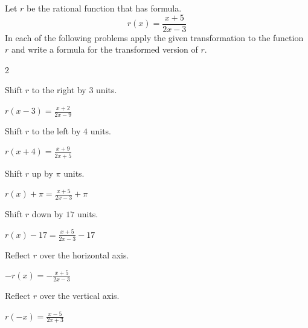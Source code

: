 \begin{exercises}
	 \begin{problem}
	 Let $r$ be the rational function that has formula.
	 \[
		 r(x)=\frac{x+5}{2x-3}
	 \]
	 In each of the following problems apply the given transformation to the function $r$ and
	 write a formula for the transformed version of $r$.
	 \begin{multicols}{2}
		 \begin{subproblem}
			 Shift $r$ to the right by $3$ units.
			 \begin{shortsolution}
				 $r(x-3)=\frac{x+2}{2x-9}$
			 \end{shortsolution}
		 \end{subproblem}
		 \begin{subproblem}
			 Shift $r$ to the left by $4$ units.
			 \begin{shortsolution}
				 $r(x+4)=\frac{x+9}{2x+5}$
			 \end{shortsolution}
		 \end{subproblem}
		 \begin{subproblem}
			 Shift $r$ up by $\pi$ units.
			 \begin{shortsolution}
				 $r(x)+\pi=\frac{x+5}{2x-3}+\pi$
			 \end{shortsolution}
		 \end{subproblem}
		 \begin{subproblem}
			 Shift $r$ down by $17$ units.
			 \begin{shortsolution}
				 $r(x)-17=\frac{x+5}{2x-3}-17$
			 \end{shortsolution}
		 \end{subproblem}
		 \begin{subproblem}
			 Reflect $r$ over the horizontal axis.
			 \begin{shortsolution}
				 $-r(x)=-\frac{x+5}{2x-3}$
			 \end{shortsolution}
		 \end{subproblem}
		 \begin{subproblem}
			 Reflect $r$ over the vertical axis.
			 \begin{shortsolution}
				 $r(-x)=\frac{x-5}{2x+3}$
			 \end{shortsolution}
		 \end{subproblem}
	 \end{multicols}
	 \end{problem}



\end{exercises}
